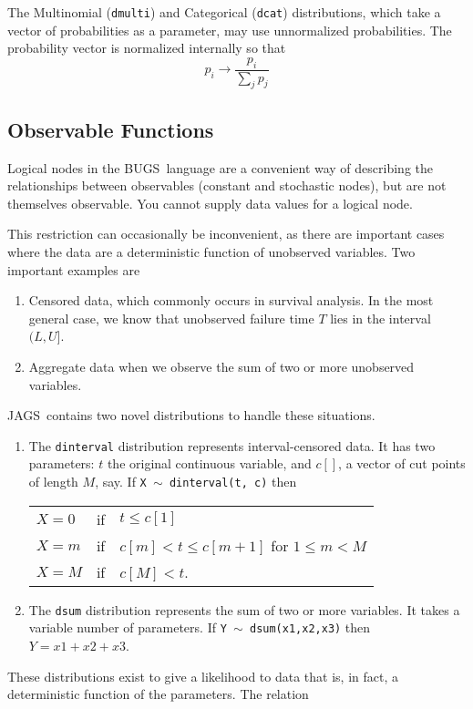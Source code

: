\documentclass[11pt, a4paper, titlepage]{report}
\newcommand{\JAGS}{\textsf{JAGS}}
\newcommand{\BUGS}{\textsf{BUGS}}
\begin{document}
The Multinomial (\verb+dmulti+) and Categorical (\verb+dcat+)
distributions, which take a vector of probabilities as a parameter,
may use unnormalized probabilities. The probability vector is
normalized internally so that
\[
p_i \rightarrow \frac{p_i}{\sum_j p_j}
\]

\subsection{Observable Functions}
\label{section:obfun}

Logical nodes in the \BUGS\ language are a convenient way of
describing the relationships between observables (constant and
stochastic nodes), but are not themselves observable. You cannot
supply data values for a logical node.  

This restriction can occasionally be inconvenient, as there are
important cases where the data are a deterministic function of
unobserved variables.  Two important examples are
\begin{enumerate}
\item Censored data, which commonly occurs in survival analysis. In
the most general case, we know that unobserved failure time $T$
lies in the interval $(L,U]$.
\item Aggregate data when we observe the sum of two or more
unobserved variables.
\end{enumerate}
\JAGS\ contains two novel distributions to handle these situations.  
\begin{enumerate}
\item The \texttt{dinterval} distribution represents interval-censored
data. It has two parameters: $t$ the original continuous variable, and
$c[]$, a vector of cut points of length $M$, say. If \texttt{X $\sim$
dinterval(t, c)} then 

\begin{tabular}{lll}
$X=0$   & if & $t \leq c[1]$\\
$X=m$   & if & $c[m] < t \leq c[m+1]$ for $1 \leq m < M$\\
$X = M$ & if & $c[M] < t$.
\end{tabular}

\item The \texttt{dsum} distribution represents the sum of two or more
variables.  It takes a variable number of parameters. If \texttt{Y $\sim$
dsum(x1,x2,x3)} then $Y=x1+x2+x3$.
\end{enumerate}
These distributions exist to give a likelihood to data that is, in fact,
a deterministic function of the parameters.  The relation
\end{document}
